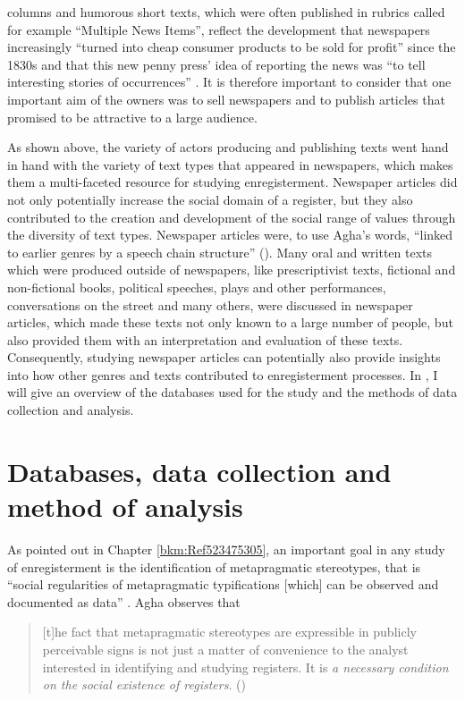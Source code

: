 columns and humorous short texts, which were often published in rubrics called for example “Multiple News Items”, reflect the development that newspapers increasingly “turned into cheap consumer products to be sold for profit” since the 1830s and that this new penny press’ idea of reporting the news was “to tell interesting stories of occurrences” \citep[104]{Nord2001}. It is therefore important to consider that one important aim of the owners was to sell newspapers and to publish articles that promised to be attractive to a large audience.

As shown above, the variety of actors producing and publishing texts went hand in hand with the variety of text types that appeared in newspapers, which makes them a multi-faceted resource for studying enregisterment. Newspaper articles did not only potentially increase the social domain of a register, but they also contributed to the creation and development of the social range of values through the diversity of text types. Newspaper articles were, to use Agha’s words, “linked to earlier genres by a speech chain structure” (\citeyear[259]{Agha2003}). Many oral and written texts which were produced outside of newspapers, like prescriptivist texts, fictional and non-fictional books, political speeches, plays and other performances, conversations on the street and many others, were discussed in newspaper articles, which made these texts not only known to a large number of people, but also provided them with an interpretation and evaluation of these texts. Consequently, studying newspaper articles can potentially also provide insights into how other genres and texts contributed to enregisterment processes. In , I will give an overview of the databases used for the study and the methods of data collection and analysis.

\section{Databases, data collection and method of analysis}
\label{bkm:Ref523405958}\hypertarget{Toc63021220}{}\label{bkm:Ref527971990}
As pointed out in Chapter \ref{bkm:Ref523475305}, an important goal in any study of enregisterment is the identification of metapragmatic stereotypes, that is “social regularities of metapragmatic typifications [which] can be observed and documented as data” \citep[154]{Agha2007}. Agha observes that


\begin{quote}
[t]he fact that metapragmatic stereotypes are expressible in publicly perceivable signs is not just a matter of convenience to the analyst interested in identifying and studying registers. It is \emph{a necessary condition on the social existence of registers}. (\citeyear[154]{Agha2007})
\end{quote}


